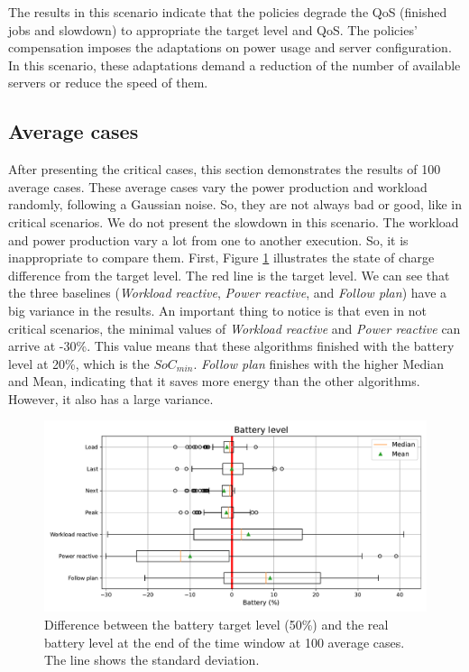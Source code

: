 The results in this scenario indicate that the policies degrade the QoS (finished jobs and slowdown) to appropriate the target level and QoS. The policies' compensation imposes the adaptations on power usage and server configuration. In this scenario, these adaptations demand a reduction of the number of available servers or reduce the speed of them. 

\clearpage

\subsection{Average cases}

After presenting the critical cases, this section demonstrates the results of 100 average cases. These average cases vary the power production and workload randomly, following a Gaussian noise. So, they are not always bad or good, like in critical scenarios. We do not present the slowdown in this scenario. The workload and power production vary a lot from one to another execution. So, it is inappropriate to compare them. First, Figure \ref{fig:SoC_diff} illustrates the state of charge difference from the target level. The red line is the target level. We can see that the three baselines (\emph{Workload reactive}, \emph{Power reactive}, and \emph{Follow plan}) have a big variance in the results. An important thing to notice is that even in not critical scenarios, the minimal values of \emph{Workload reactive} and \emph{Power reactive} can arrive at -30\%. This value means that these algorithms finished with the battery level at 20\%, which is the $SoC_{min}$. \emph{Follow plan} finishes with the higher Median and Mean, indicating that it saves more energy than the other algorithms. However, it also has a large variance.

\begin{figure}[!htb]
    \centering
    \includegraphics[scale=0.55]{Images/Compensations/battery_diff.pdf}
    \caption{Difference between the battery target level (50\%) and the real battery level at the end of the time window at 100 average cases. The line shows the standard deviation.}
    \label{fig:SoC_diff}
\end{figure}

